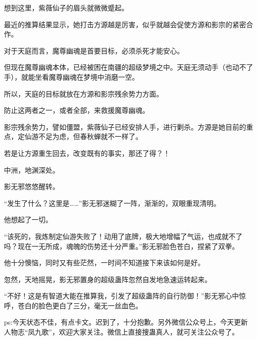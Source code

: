 \begin{this_body}
想到这里，紫薇仙子的眉头就微微蹙起。

最近的推算结果显示，她打击方源越是厉害，似乎就越会促使方源和影宗的紧密合作。

对于天庭而言，魔尊幽魂是首要目标，必须杀死才能安心。

但现在魔尊幽魂本体，已经被困在南疆的超级梦境之中。天庭无须动手（也动不了手），就能坐看魔尊幽魂在梦境中消磨一空。

所以，天庭的目标就放在方源和影宗残余势力方面。

防止这两者之一，或者全部，来救援魔尊幽魂。

影宗残余势力，譬如僵盟，紫薇仙子已经安排人手，进行剿杀。方源是她目前的重点，定仙游不足为虑，但春秋蝉就不一样了。

若是让方源重生回去，改变既有的事实，那还了得？！

中洲，地渊深处。

影无邪悠悠醒转。

“发生了什么？这里是……”影无邪迷糊了一阵，渐渐的，双眼重现清明。

他想起了一切。

“该死的，我炼制定仙游失败了！动用了底牌，极大地增幅了气运，也成就不了吗？现在一无所成，魂魄的伤势还十分严重。”影无邪脸色苍白，捏紧了双拳。

他十分懊恼，同时又有些茫然，一时间不知道接下来该如何是好。

忽然，天地摇晃，影无邪置身的超级蛊阵忽然自发地急速运转起来。

“不好！这是有智道大能在推算我，引发了超级蛊阵的自行防御！”影无邪心中惊呼，苍白的脸色更白了三分，毫无一丝血色。

ps:今天状态不佳，有点卡文。迟到了，十分抱歉。另外微信公众号上，今天更新人物志“凤九歌”，欢迎大家关注。微信上直接搜蛊真人，就可关注公众号了。

\end{this_body}

